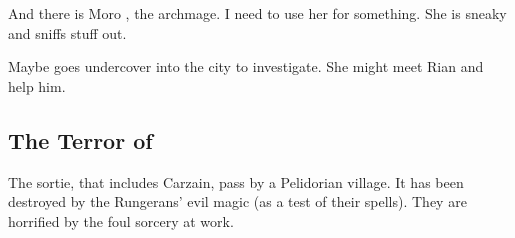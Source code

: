 \begin{garbage}
And there is Moro \Cornel, the archmage. 
I need to use her for something. 
She is sneaky and sniffs stuff out. 

Maybe \Cornel{} goes undercover into the city to investigate. 
She might meet Rian and help him. 







% 
% 
% 

















\subsection{The Terror of \EreshKal}
The sortie, that includes Carzain, pass by a Pelidorian village. It has been destroyed by the Rungerans' evil magic (as a test of their spells). They are horrified by the foul sorcery at work. 









\end{garbage}

